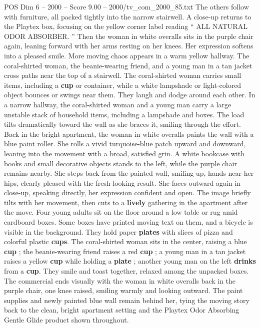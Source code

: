 \begin{textsample}{POS Dim 6 – 2000 – Score 9.00 – 2000/tv\_com\_2000\_85.txt}
The others follow with furniture, all packed tightly into the narrow stairwell.
A close-up returns to the Playtex box, focusing on the yellow corner label reading “ ALL NATURAL ODOR ABSORBER. ” Then the woman in white overalls sits in the purple chair again, leaning forward with her arms resting on her knees.
Her expression softens into a pleased smile.
More moving chaos appears in a warm yellow hallway.
The coral-shirted woman, the beanie-wearing friend, and a young man in a tan jacket cross paths near the top of a stairwell.
The coral-shirted woman carries small items, including a \textbf{cup} or container, while a white lampshade or light-colored object bounces or swings near them.
They laugh and dodge around each other.
In a narrow hallway, the coral-shirted woman and a young man carry a large unstable stack of household items, including a lampshade and boxes.
The load tilts dramatically toward the wall as she braces it, smiling through the effort.
Back in the bright apartment, the woman in white overalls paints the wall with a blue paint roller.
She rolls a vivid turquoise-blue patch upward and downward, leaning into the movement with a broad, satisfied grin.
A white bookcase with books and small decorative objects stands to the left, while the purple chair remains nearby.
She steps back from the painted wall, smiling up, hands near her hips, clearly pleased with the fresh-looking result.
She faces outward again in close-up, speaking directly, her expression confident and open.
The image briefly tilts with her movement, then cuts to a \textbf{lively} gathering in the apartment after the move.
Four young adults sit on the floor around a low table or rug amid cardboard boxes.
Some boxes have printed moving text on them, and a bicycle is visible in the background.
They hold paper \textbf{plates} with slices of pizza and colorful plastic \textbf{cups}.
The coral-shirted woman sits in the center, raising a blue \textbf{cup} ; the beanie-wearing friend raises a red \textbf{cup} ; a young man in a tan jacket raises a yellow \textbf{cup} while holding a \textbf{plate} ; another young man on the left \textbf{drinks} from a \textbf{cup}.
They smile and toast together, relaxed among the unpacked boxes.
The commercial ends visually with the woman in white overalls back in the purple chair, one knee raised, smiling warmly and looking outward.
The paint supplies and newly painted blue wall remain behind her, tying the moving story back to the clean, bright apartment setting and the Playtex Odor Absorbing Gentle Glide product shown throughout.

\end{textsample}
